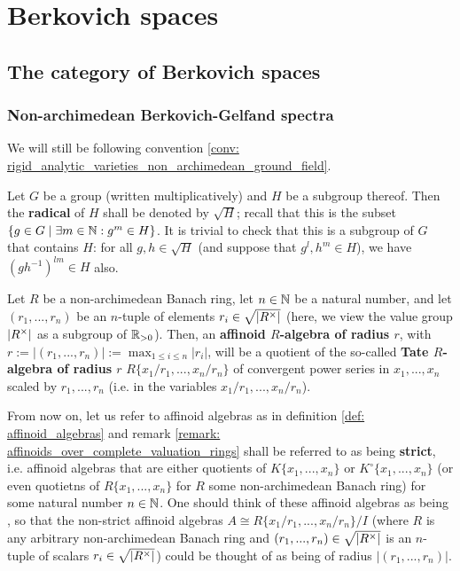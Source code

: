 \section{Berkovich spaces}
    \subsection{The category of Berkovich spaces}
        \subsubsection{Non-archimedean Berkovich-Gelfand spectra}
            \begin{convention}
                We  will still be following convention \ref{conv: rigid_analytic_varieties_non_archimedean_ground_field}.
            \end{convention}
            \begin{convention}
                Let $G$ be a group (written multiplicatively) and $H$ be a subgroup thereof. Then the \textbf{radical} of $H$ shall be denoted by $\sqrt{H}$; recall that this is the subset $\{g \in G \mid \exists m \in \mathbb{N}: g^m \in H\}$. It is trivial to check that this is a subgroup of $G$ that contains $H$: for all $g, h \in \sqrt{H}$ (and suppose that $g^l, h^m \in H$), we have $(gh^{-1})^{lm} \in H$ also.
            \end{convention}
            \begin{definition} \label{def: generalised_affinoid_algebras}
                Let $R$ be a non-archimedean Banach ring, let $n \in \mathbb{N}$ be a natural number, and let $(r_1, ..., r_n)$ be an $n$-tuple of elements $r_i \in \sqrt{|R^{\x}|}$ (here, we view the value group $|R^{\x}|$ as a subgroup of $\mathbb{R}_{> 0}$). Then, an \textbf{affinoid $R$-algebra of radius $r$}, with $r := |(r_1, ..., r_n)| := \max_{1 \leq i \leq n} |r_i|$, will be a quotient of the so-called \textbf{Tate $R$-algebra of radius $r$} $R\{x_1/r_1, ..., x_n/r_n\}$ of convergent power series in $x_1, ..., x_n$ scaled by $r_1, ..., r_n$ (i.e. in the variables $x_1/r_1, ..., x_n/r_n$). 
            \end{definition}
            \begin{convention}
                From now on, let us refer to affinoid algebras as in definition \ref{def: affinoid_algebras} and remark \ref{remark: affinoids_over_complete_valuation_rings} shall be referred to as being \textbf{strict}, i.e. affinoid algebras that are either quotients of $K\{x_1, ..., x_n\}$ or $K^{\circ}\{x_1, ..., x_n\}$ (or even quotietns of $R\{x_1, ..., x_n\}$ for $R$ some non-archimedean Banach ring) for some natural number $n \in \mathbb{N}$. One should think of these affinoid algebras as being , so that the non-strict affinoid algebras $A \cong R\{x_1/r_1, ..., x_n/r_n\}/I$ (where $R$ is any arbitrary non-archimedean Banach ring and $(r_1, ..., r_n) \in \sqrt{|R^{\x}|}$ is an $n$-tuple of scalars $r_i \in \sqrt{|R^{\x}|}$) could be thought of as being of radius $|(r_1, ..., r_n)|$.
            \end{convention}
